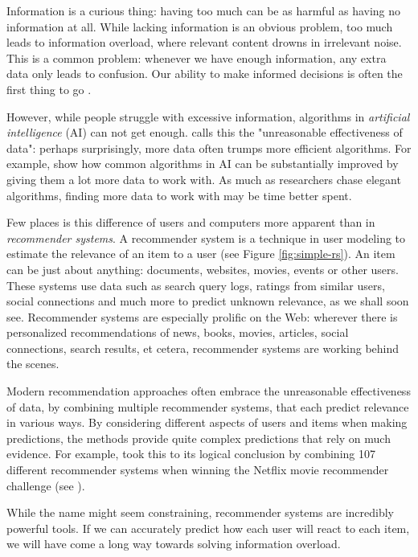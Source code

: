 \label{chap:intro}

Information is a curious thing:
having too much can be as harmful as having no information at all.
While lacking information is an obvious problem,
too much leads to information overload,
where relevant content drowns in irrelevant noise.
This is a common problem: whenever we have enough information,
any extra data only leads to confusion.
Our ability to make informed decisions is often the first thing to go
\cite[p1]{Davenport2001}.

However, while people struggle with excessive information,
algorithms in \emph{artificial intelligence} (AI) can not get enough.
\citet[p1]{Halevy2009} calls this the "unreasonable effectiveness of data":
perhaps surprisingly, more data often trumps more efficient algorithms.
For example, \citet[p3]{Banko2001} show how common algorithms in AI 
can be substantially improved by giving them a lot more data to work with.
As much as researchers chase elegant algorithms, finding more data to work with may be time better spent.

Few places is this difference of users and computers more apparent than in \emph{recommender systems}.
A recommender system is a technique in user modeling to estimate the relevance of an item to a user
(see Figure \ref{fig:simple-rs}).
An item can be just about anything: documents, websites, movies, events or other users.
These systems use data such as search query logs, 
ratings from similar users, social connections and much more
to predict unknown relevance, as we shall soon see.
Recommender systems are especially prolific on the Web: 
wherever there is personalized recommendations of news, books, movies,
articles, social connections, search results, et cetera, recommender systems are working behind the scenes.

Modern recommendation approaches often embrace the 
unreasonable effectiveness of data,
by combining multiple recommender systems, that each predict relevance in various ways.
By considering different aspects of users and items when making predictions,
the methods provide quite complex predictions that rely on much evidence.
For example, \citet[p1]{Bell2007} took this to its logical conclusion by 
combining 107 different recommender systems when winning the 
Netflix movie recommender challenge
(see \citet{Linden2009}).

While the name might seem constraining, recommender systems are incredibly powerful tools.
If we can accurately predict how each user will react to each item,
we will have come a long way towards solving information overload.

